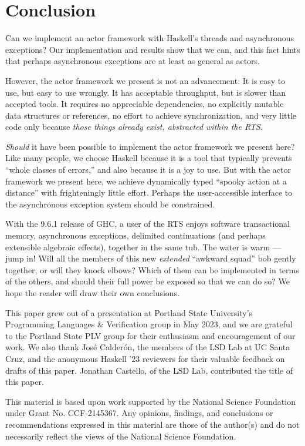 \documentclass[sigplan,screen]{acmart}
\begin{document}
\section{Conclusion}
\label{sec:conclusion}

Can we implement an actor framework with Haskell's threads and asynchronous
exceptions?
%
Our implementation and results show that we can, and this fact hints that
perhaps asynchronous exceptions are at least as general as actors.


However, the actor framework we present is not an advancement:
%
It is easy to use, but easy to use wrongly.
%
It has acceptable throughput, but is slower than accepted
tools.
%
It requires no appreciable dependencies, no explicitly mutable data structures
or references, no effort to achieve synchronization, and very little code only
because \emph{those things already exist, abstracted within the RTS}.


\emph{Should} it have been possible to implement the actor framework we present
here?
%
Like many people, we choose Haskell because it is a tool that typically
prevents ``whole classes of errors,'' and also because it is a joy to use.
%
But with the actor framework we present here,
we achieve dynamically typed ``spooky action at a distance''
with frighteningly little effort.
%
Perhaps the user-accessible interface to the asynchronous exception system
should be constrained.

With the 9.6.1 release of GHC,
a user of the RTS enjoys
software transactional memory,
asynchronous exceptions,
delimited continuations (and perhaps extensible algebraic effects),
together in the same tub.
%
The water is warm --- jump in!
%
Will all the members of this new \emph{extended} ``awkward squad''
\cite{peytonjones2001tackling} bob gently together, or will they knock elbows?
%
Which of them can be implemented in terms of the
others, and should their full power be exposed so that we can do so?
%
We hope the reader will draw their own conclusions.









\begin{acks}
This paper grew out of a presentation at Portland State University's Programming Languages \& Verification group in May 2023, and we are grateful to the Portland State PLV group for their enthusiasm and encouragement of our work.
%
We also thank Jos\'{e} Calder\'{o}n, the members of the LSD Lab at UC Santa Cruz, and the anonymous Haskell '23 reviewers for their valuable feedback on drafts of this paper.
Jonathan Castello, of the LSD Lab, contributed the title of this paper.

This material is based upon work supported by the National Science Foundation under Grant No. CCF-2145367. Any opinions, findings, and conclusions or recommendations expressed in this material are those of the author(s) and do not necessarily reflect the views of the National Science Foundation.
\end{acks}
\end{document}
